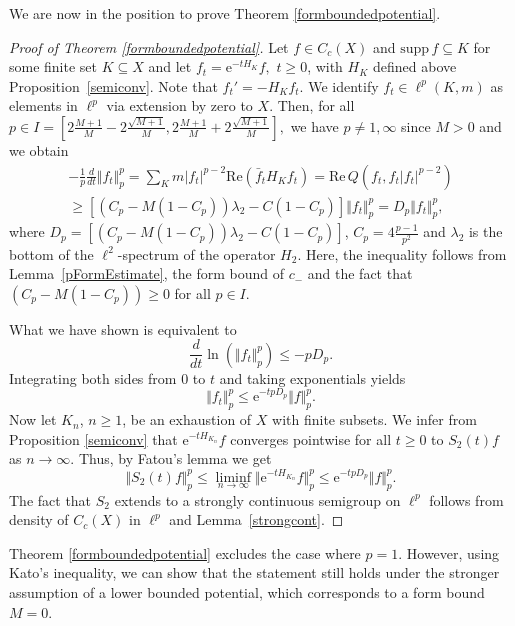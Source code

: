 \documentclass[10pt]{amsart}
\theoremstyle{definition}
\begin{document}
We are now in the position to prove Theorem \ref{formboundedpotential}.

\begin{proof}[Proof of Theorem \ref{formboundedpotential}]
    Let $  f \in C_c(X)$ and $\mathrm{supp}\,  f\subseteq K$ for some finite set $K\subseteq X$ and let $  f_t = \mathrm{e}^{-tH_K}  f,$  $t\geq 0$, with $H_K$ defined above Proposition~\ref{semiconv}. Note that $  f_t' = -H_K  f_t.$
    We identify $  f_t\in\ell^p(K,m)$ as elements in $\ell^p$ via extension by zero to $ X.$ Then, for all $p\in I =  [2\frac{M+1}{M}-2\frac{\sqrt{M+1}}{M},2\frac{M+1}{M}+2\frac{\sqrt{M+1}}{M}],$ we have $ p\neq 1,\infty  $ since $ M>0 $ and we obtain
    \begin{multline*}
        -\frac{1}{p}\frac{d}{dt}\Vert  f_t\Vert_p^p =\sum_{K}m\vert  f_t\vert^{p-2}\mathrm{Re}(\bar f_t H_K f_t)
         =\mathrm{Re} \,{Q}(f_t,f_t\vert  f_t\vert^{p-2})\\
        \geq \left[\left(C_p-M(1-C_p)\right)\lambda_2-C(1-C_p)\right]\Vert  f_t\Vert_p^p = D_p\Vert  f_t\Vert_p^p,
    \end{multline*}
    where $D_p =\left[\left(C_p-M(1-C_p)\right)\lambda_2-C(1-C_p)\right]$, $C_p = 4\frac{p-1}{p^2}$ and $\lambda_2$ is the bottom of the $\ell^2$-spectrum of the operator $ H_2.$
Here, the inequality follows from Lemma~\ref{pFormEstimate}, the form bound of $c_-$ and the fact that 
 $\left(C_p-M(1-C_p)\right)\geq 0$ for all $p\in I.$

 What we have shown is equivalent to 
 \[\frac{d}{dt}\ln({\Vert  f_t\Vert}_p^p)\leq -{p}D_p.\] Integrating both sides from $0$ to $t$ and taking exponentials yields
 \[\Vert  f_t\Vert^p_p\leq \mathrm{e}^{-tpD_p}\Vert  f\Vert^p_p.\] Now let $K_n$, $n\geq 1$, be an exhaustion of $ X$ with finite subsets. We infer from Proposition \ref{semiconv} that $\mathrm{e}^{-t{H}_{K_n}}  f$ converges pointwise for all $t\geq 0$ to $S_2(t)  f$ as $n\rightarrow\infty.$ Thus, by Fatou's lemma we get 
 \[\Vert S_2(t)  f\Vert_p^p\leq \liminf_{n\to \infty}\Vert \mathrm{e}^{-t{H}_{K_n}}  f\Vert_p^p\leq\mathrm{e}^{-tpD_p}\Vert  f\Vert_p^p.\]
 The fact that $S_2$ extends to a strongly continuous semigroup on $\ell^p$ follows from density of $C_c(X)$ in $\ell^p$ and  Lemma~\ref{strongcont}.
 \end{proof}


Theorem \ref{formboundedpotential} excludes the case where $p = 1.$ However, using Kato's inequality, we can show that the statement still holds under the stronger assumption of a lower bounded potential, which corresponds to a form bound $M=0.$
\end{document}
